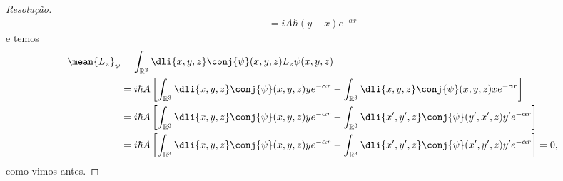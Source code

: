\begin{proof}[Resolução]
\begin{align*}
                        = i A \hbar (y - x)  e^{- \alpha r}
    \end{align*}
    e temos
    \begin{align*}
        \mean{L_z}_{\psi} &= \int_{\mathbb{R}^3} \dli{x,y,z} \conj{\psi}(x,y,z) L_z \psi(x,y,z)\\
                          &= i\hbar A\left[\int_{\mathbb{R}^3} \dli{x,y,z} \conj{\psi}(x,y,z)y e^{-\alpha r} - \int_{\mathbb{R}^3} \dli{x,y,z} \conj{\psi}(x,y,z) x e^{-\alpha r}\right]\\
                          &= i\hbar A\left[\int_{\mathbb{R}^3} \dli{x,y,z} \conj{\psi}(x,y,z)y e^{-\alpha r} - \int_{\mathbb{R}^3} \dli{x',y',z} \conj{\psi}(y',x',z) y' e^{-\alpha r}\right]\\
                          &= i\hbar A\left[\int_{\mathbb{R}^3} \dli{x,y,z} \conj{\psi}(x,y,z)y e^{-\alpha r} - \int_{\mathbb{R}^3} \dli{x',y',z} \conj{\psi}(x',y',z) y' e^{-\alpha r}\right] = 0,
    \end{align*}
    como vimos antes.


\end{proof}
